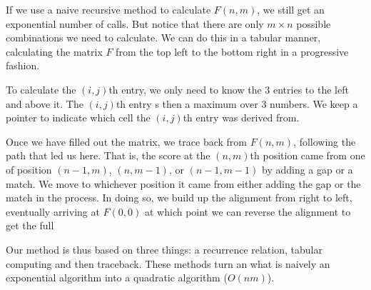 \documentclass[11pt]{article}
\begin{document}
If we use a naive recursive method to calculate $F(n,m)$, we still get an exponential number of calls. But notice that there are only $m \times n$ possible combinations we need to calculate. We can do this in a tabular manner, calculating the matrix $F$ from the top left to the bottom right in a progressive fashion.

To calculate the $(i,j)$th entry, we only need to know the 3 entries to the left and above it.  The $(i,j)$th entry s then a maximum over 3 numbers.  We keep a pointer to indicate which cell the $(i,j)$th entry was derived from.




Once we have filled out the matrix, we trace back from  $F(n,m)$, following the path that led us here.   That is, the score at the $(n,m)$th position came from one of position  $(n-1,m)$, $(n,m-1)$, or $(n-1,m-1)$ by adding a gap or a match.  We move to whichever position it came from either adding the gap or the match in the process.  In doing so, we build up the alignment from right to left, eventually arriving at $F(0,0)$ at which point we can reverse the alignment to get the full 

Our method is thus based on three things: a recurrence relation, tabular computing and then traceback.  These methods  turn an what is naively an exponential algorithm into a quadratic algorithm ($O(nm)$).
\end{document}
